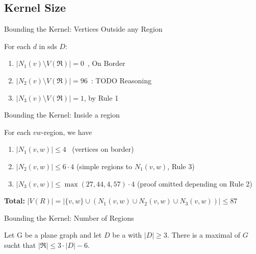 \subsection{Kernel Size}
\begin{frame}[c]{Bounding the Kernel: Vertices Outside any Region}   
    \begin{figure}[!ht]
    \end{figure}

    \pause For each $d$ in sds $D$:
    \begin{enumerate}
           \pause \item $|N_1(v) \setminus V(\mathfrak{R})| = 0$~\cite{Alber2004}, On Border
           \pause \item $|N_2(v) \setminus V(\mathfrak{R})| = 96$~\cite{Alber2004}: TODO Reasoning  
           \pause \item $|N_3(v) \setminus V(\mathfrak{R})| = 1$, by Rule 1
        \end{enumerate}
\end{frame}
\begin{frame}[c]{Bounding the Kernel: Inside a region}

    \begin{figure}[!ht]
    \end{figure}
    For each $vw$-region, we have
    \begin{enumerate}
\pause        \item $|N_1(v,w)| \leq 4$~\cite{Alber2004} (vertices on border)
\pause        \item $|N_2(v,w)| \leq 6 \cdot 4$ (simple regions to $N_1(v,w)$, Rule 3)
\pause        \item $|N_3(v,w)| \leq \max(27,44,4,57) \cdot 4$ (proof omitted depending on Rule 2)
    \end{enumerate}

    \textbf{Total: } $|V(R)| = |\{v, w\} \cup (N_1(v,w) \cup N_2(v, w) \cup N_3(v, w))| \leq 87$
\end{frame}
\begin{frame}[c]{Bounding the Kernel: Number of Regions}

    \begin{figure}[!ht]

    \end{figure}
    \pause\begin{tcolorbox}[colback=TUMBlueLighter,title=Number of Regions~\cite{Alber2004}]
        Let G be a plane graph and let $D$ be a \sdom with $|D| \geq 3$. There is a maximal \dreg of $G$ sucht that $|\mathfrak{R}| \leq 3 \cdot |D|- 6$.
    \end{tcolorbox}

\end{frame}

